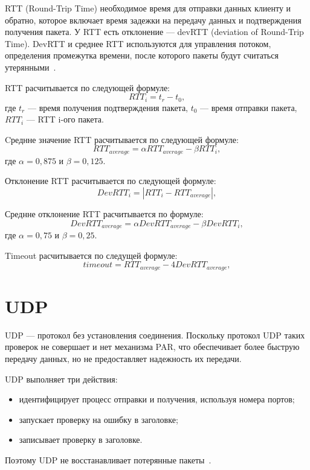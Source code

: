 RTT (Round-Trip Time) необходимое время для отправки данных клиенту и обратно, которое включает время задежки на передачу данных и подтверждения получения пакета. У RTT есть отклонение --- devRTT (deviation of Round-Trip Time).
DevRTT и среднее RTT используются для управления потоком, определения промежутка времени, после которого пакеты будут считаться утерянными~\cite{rfc_tcp}.

RTT расчитывается по следующей формуле:
\begin{equation*}
	\label{formula:rtt}
	RTT_i = t_{r} - t_{0},
\end{equation*}
где $t_{r}$ --- время получения подтверждения пакета, $t_{0}$ --- время отправки пакета, $RTT_i$ --- RTT i-ого пакета.

Cреднне значение RTT расчитывается по следующей формуле:
\begin{equation*}
	\label{formula:avg_rtt}
	RTT_{average} = \alpha RTT_{average} - \beta RTT_{i},
\end{equation*}
где $\alpha = 0,875$  и $\beta = 0,125$.

Отклонение RTT расчитывается по следующей формуле:
\begin{equation*}
	\label{formula:dev_rtt}
	DevRTT_{i} = |RTT_{i} - RTT_{average}|,
\end{equation*}

Среднне отклонение RTT расчитывается по формуле: 
\begin{equation*}
	\label{formula:avg_dev_rtt}
	DevRTT_{average} = \alpha DevRTT_{average} - \beta DevRTT_{i},
\end{equation*}
где $\alpha = 0,75$  и $\beta = 0,25$.

Timeout расчитывается по следущей формуле:
\begin{equation*}
	\label{formula:timeout}
	timeout = RTT_{average} - 4DevRTT_{average},
\end{equation*}

\section{UDP}

UDP --- протокол без установления соединения.
Поскольку протокол UDP таких проверок не совершает и нет механизма PAR, что обеспечивает более быструю передачу данных, но не предоставляет надежность их передачи.

\clearpage

UDP выполняет три действия:
\begin{itemize}
	\item идентифицирует процесс отправки и получения, используя номера портов;
	\item запускает проверку на ошибку в заголовке;
	\item записывает проверку в заголовке.
\end{itemize}
Поэтому UDP не восстанавливает потерянные пакеты~\cite{tcp_ip_reilly, tcp_ip_lora, protocls_lakin}. 

